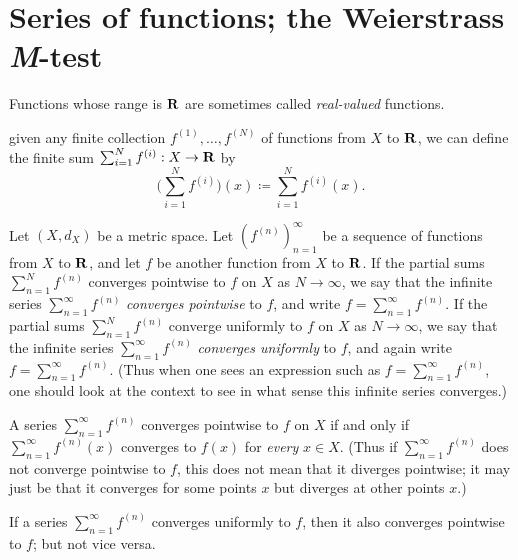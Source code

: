 \section{Series of functions; the Weierstrass \emph{M}-test}\label{sec 3.5}

\begin{note}
    Functions whose range is \(\mathbf{R}\) are sometimes called \emph{real-valued} functions.
\end{note}

\begin{note}
    given any finite collection \(f^{(1)}, \dots, f^{(N)}\) of functions from \(X\) to \(\mathbf{R}\), we can define the finite sum \(\sum_{i = 1}^N f^{(i)} : X \to \mathbf{R}\) by
    \[
        \bigg(\sum_{i = 1}^N f^{(i)}\bigg)(x) \coloneqq \sum_{i = 1}^N f^{(i)}(x).
    \]
\end{note}

\setcounter{theorem}{1}
\begin{definition}\label{3.5.2}
    Let \((X, d_X)\) be a metric space.
    Let \((f^{(n)})_{n = 1}^\infty\) be a sequence of functions from \(X\) to \(\mathbf{R}\), and let \(f\) be another function from \(X\) to \(\mathbf{R}\).
    If the partial sums \(\sum_{n = 1}^N f^{(n)}\) converges pointwise to \(f\) on \(X\) as \(N \to \infty\), we say that the infinite series \(\sum_{n = 1}^\infty f^{(n)}\) \emph{converges pointwise} to \(f\), and write \(f = \sum_{n = 1}^\infty f^{(n)}\).
    If the partial sums \(\sum_{n = 1}^N f^{(n)}\) converge uniformly to \(f\) on \(X\) as \(N \to \infty\), we say that the infinite series \(\sum_{n = 1}^\infty f^{(n)}\) \emph{converges uniformly} to \(f\), and again write \(f = \sum_{n = 1}^\infty f^{(n)}\).
    (Thus when one sees an expression such as \(f = \sum_{n = 1}^\infty f^{(n)}\), one should look at the context to see in what sense this infinite series converges.)
\end{definition}

\begin{remark}\label{3.5.3}
    A series \(\sum_{n = 1}^\infty f^{(n)}\) converges pointwise to \(f\) on \(X\) if and only if \(\sum_{n = 1}^\infty f^{(n)}(x)\) converges to \(f(x)\) for \emph{every} \(x \in X\).
    (Thus if \(\sum_{n = 1}^\infty f^{(n)}\) does not converge pointwise to \(f\), this does not mean that it diverges pointwise;
    it may just be that it converges for some points \(x\) but diverges at other points \(x\).)
\end{remark}

\begin{note}
    If a series \(\sum_{n = 1}^\infty f^{(n)}\) converges uniformly to \(f\), then it also converges pointwise to \(f\);
    but not vice versa.
\end{note}

